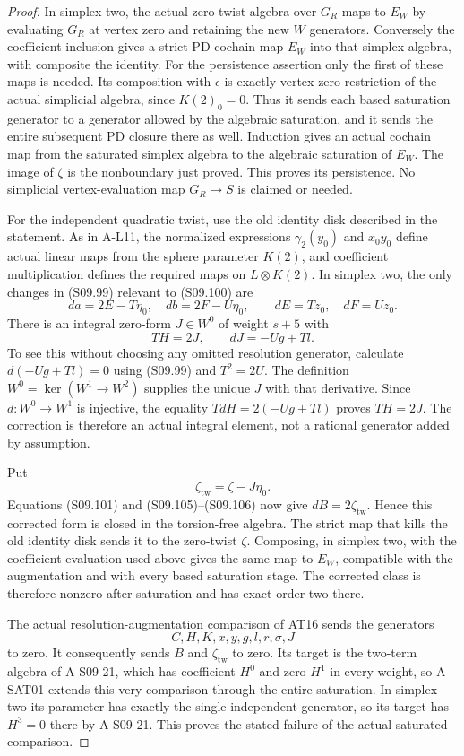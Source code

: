 \begin{proof}
In simplex two, the actual zero-twist algebra over
$G_R$ maps to $E_W$ by evaluating $G_R$ at vertex zero
and retaining the new $W$ generators.  Conversely the
coefficient inclusion gives a strict PD cochain map
$E_W$ into that simplex algebra, with composite the
identity.  For the persistence assertion only the first
of these maps is needed.  Its composition with
$\epsilon$ is exactly vertex-zero restriction of the
actual simplicial algebra, since $K(2)_0=0$.
Thus it sends each based saturation generator to a
generator allowed by the algebraic saturation, and
it sends the entire subsequent PD closure there as
well.  Induction gives an actual cochain map from the
saturated simplex algebra to the algebraic saturation
of $E_W$.  The image of $\zeta$ is the nonboundary
just proved.  This proves its persistence.  No
simplicial vertex-evaluation map $G_R\to S$ is claimed
or needed.

For the independent quadratic twist, use the old
identity disk described in the statement.  As in A-L11,
the normalized expressions $\gamma_2(y_0)$ and
$x_0y_0$ define actual linear maps from the sphere
parameter $K(2)$, and coefficient multiplication
defines the required maps on $L\otimes K(2)$.
In simplex two, the only changes in (S09.99) relevant
to (S09.100) are
\[
 da=2E-T\eta_0,\quad db=2F-U\eta_0,
 \qquad dE=Tz_0,\quad dF=Uz_0.                     \tag{S09.105}
\]
There is an integral zero-form $J\in W^0$ of weight
$s+5$ with
\[
              TH=2J,\qquad dJ=-Ug+Tl.
 \tag{S09.106}
\]
To see this without choosing any omitted resolution
generator, calculate $d(-Ug+Tl)=0$ using (S09.99) and
$T^2=2U$.  The definition
$W^0=\ker(W^1\to W^2)$ supplies the unique $J$ with
that derivative.  Since $d:W^0\to W^1$ is injective,
the equality $TdH=2(-Ug+Tl)$ proves $TH=2J$.
The correction is therefore an actual integral element,
not a rational generator added by assumption.

Put
\[
                         \zeta_{\mathrm{tw}}
                                  =\zeta-J\eta_0.
 \tag{S09.107}
\]
Equations (S09.101) and (S09.105)--(S09.106) now give
$dB=2\zeta_{\mathrm{tw}}$.  Hence this corrected
form is closed in the torsion-free algebra.  The strict
map that kills the old identity disk sends it to the
zero-twist $\zeta$.  Composing, in simplex two, with
the coefficient evaluation used above gives the same
map to $E_W$, compatible with the augmentation and
with every based saturation stage.  The corrected
class is therefore nonzero after saturation and has
exact order two there.

The actual resolution-augmentation comparison of AT16
sends the generators
\[
                 C,H,K,x,y,g,l,r,\sigma,J
\]
to zero.
It consequently sends $B$ and $\zeta_{\mathrm{tw}}$
to zero.  Its target is the two-term algebra of
A-S09-21, which has coefficient $H^0$ and zero $H^1$
in every weight, so A-SAT01 extends this very comparison
through the entire saturation.  In simplex two its
parameter has exactly the single independent generator,
so its target has $H^3=0$ there by A-S09-21.  This proves the stated failure
of the actual saturated comparison.
\end{proof}

